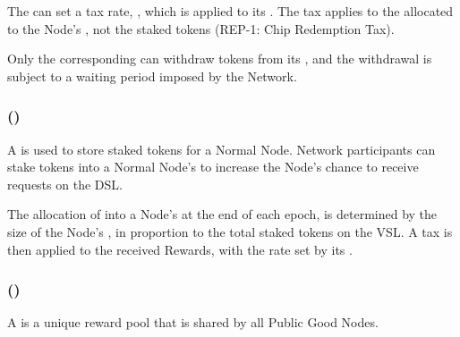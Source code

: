 The  can set a tax rate, , which is applied to its .
The tax applies to the  allocated to the Node's , not the staked tokens (REP-1: Chip Redemption Tax).

Only the corresponding  can withdraw tokens from its , and the withdrawal is subject to a waiting period imposed by the Network.

\subsubsection{ ()}

A  is used to store staked tokens for a Normal Node. Network participants can stake tokens into a Normal Node's  to increase the Node's chance to receive requests on the \gls{DSL}.

The allocation of  into a Node's  at the end of each epoch, is determined by the size of the Node's , in proportion to the total staked tokens on the \gls{VSL}.
A tax is then applied to the received Rewards, with the rate set by its .

\subsubsection{ ()}

A  is a unique reward pool that is shared by all Public Good Nodes.

